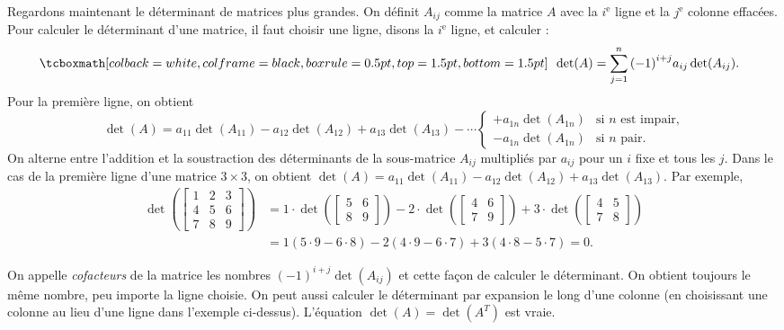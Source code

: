 Regardons maintenant le déterminant de matrices plus grandes. On définit $A_{ij}$ comme la matrice $A$ avec la $i^{\text{e}}$ ligne et la $j^{\text{e}}$ colonne effacées. Pour calculer le déterminant d’une matrice, il faut choisir une ligne, disons la
$i^{\text{e}}$ ligne, et calculer :
\begin{equation*}
\mybxbg{~~
\det (A) =
\sum_{j=1}^n
{(-1)}^{i+j}
a_{ij} \det (A_{ij}) .
~~}
\end{equation*}
Pour la première ligne, on obtient
\begin{equation*}
\det (A) =
a_{11} \det (A_{11}) - 
a_{12} \det (A_{12}) + 
a_{13} \det (A_{13}) - 
\cdots
\begin{cases}
+ a_{1n} \det (A_{1n}) & \text{si } n \text{ est impair,} \\
- a_{1n} \det (A_{1n}) & \text{si } n \text{ pair.}
\end{cases}
\end{equation*}
On alterne entre l’addition et la soustraction des déterminants de la sous-matrice 
$A_{ij}$ multipliés par $a_{ij}$ pour un $i$ fixe et tous les $j$.
Dans le cas de la première ligne d’une matrice $3 \times 3$,
on obtient $\det (A) = a_{11} \det (A_{11}) -
a_{12} \det (A_{12}) + a_{13} \det (A_{13})$.  Par exemple,
\begin{equation*}
\begin{split}
\det \left(
\begin{bmatrix}
1 & 2 & 3 \\
4 & 5 & 6 \\
7 & 8 & 9
\end{bmatrix}
\right)
& =
1 \cdot
\det \left(
\begin{bmatrix}
5 & 6 \\
8 & 9
\end{bmatrix}
\right)
-
2 \cdot
\det \left(
\begin{bmatrix}
4 & 6 \\
7 & 9
\end{bmatrix}
\right)
+
3 \cdot
\det \left(
\begin{bmatrix}
4 & 5 \\
7 & 8
\end{bmatrix}
\right) \\
& =
1 (5 \cdot 9 - 6 \cdot 8)
-
2 (4 \cdot 9 - 6 \cdot 7)
+
3 (4 \cdot 8 - 5 \cdot 7)
= 0 .
\end{split}
\end{equation*}

On appelle \emph{cofacteurs} de la matrice les nombres ${(-1)}^{i+j}\det(A_{ij})$ et
\emph{} cette façon de calculer le déterminant.
On obtient toujours le même nombre, peu importe la ligne choisie. On peut aussi calculer le déterminant par expansion le long d’une colonne (en choisissant une colonne au lieu d'une ligne dans l’exemple ci-dessus). L’équation $\det(A) = \det(A^T)$ est vraie.

